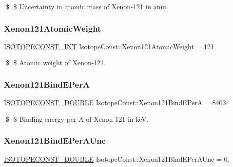 \$ \$ Uncertainty in atomic mass of Xenon-\/121 in amu. \mbox{\label{group___isotope_const-_xenon-_xe121_ga427bae64677e6e6fa2d4120f4153fc8e}} 
\subsubsection{\texorpdfstring{Xenon121\+Atomic\+Weight}{Xenon121AtomicWeight}}
{\footnotesize\ttfamily \mbox{\hyperlink{group___isotope_const-_macros_ga5f18360b3e99483a35c32d789e62621c}{I\+S\+O\+T\+O\+P\+E\+C\+O\+N\+S\+T\+\_\+\+I\+NT}} Isotope\+Const\+::\+Xenon121\+Atomic\+Weight = 121}

\$ \$ Atomic weight of Xenon-\/121. \mbox{\label{group___isotope_const-_xenon-_xe121_gad6c02449e96ae6eaca8ccd78c1d245c4}} 
\subsubsection{\texorpdfstring{Xenon121\+Bind\+E\+PerA}{Xenon121BindEPerA}}
{\footnotesize\ttfamily \mbox{\hyperlink{group___isotope_const-_macros_ga8f45a7272ce02c0b4c65c44636ed719a}{I\+S\+O\+T\+O\+P\+E\+C\+O\+N\+S\+T\+\_\+\+D\+O\+U\+B\+LE}} Isotope\+Const\+::\+Xenon121\+Bind\+E\+PerA = 8403.}

\$ \$ Binding energy per A of Xenon-\/121 in keV. \mbox{\label{group___isotope_const-_xenon-_xe121_ga348999634a215de7b80763e24de18ba5}} 
\subsubsection{\texorpdfstring{Xenon121\+Bind\+E\+Per\+A\+Unc}{Xenon121BindEPerAUnc}}
{\footnotesize\ttfamily \mbox{\hyperlink{group___isotope_const-_macros_ga8f45a7272ce02c0b4c65c44636ed719a}{I\+S\+O\+T\+O\+P\+E\+C\+O\+N\+S\+T\+\_\+\+D\+O\+U\+B\+LE}} Isotope\+Const\+::\+Xenon121\+Bind\+E\+Per\+A\+Unc = 0.}

